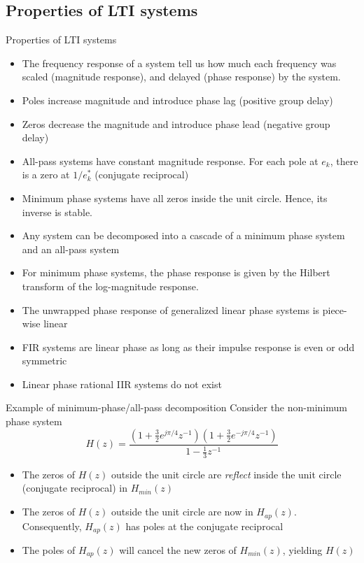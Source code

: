 \documentclass[10pt, aspectratio=169]{beamer}
\begin{document}
%
\subsection{Properties of LTI systems}
\begin{frame}{Properties of LTI systems}
\begin{itemize}
	\item The frequency response of a system tell us how much each frequency was scaled (magnitude response), and delayed (phase response) by the system.
	\item Poles increase magnitude and introduce phase lag (positive group delay)
	\item Zeros decrease the magnitude and introduce phase lead (negative group delay)
	\item All-pass systems have constant magnitude response. For each pole at $e_k$, there is  a zero at $1/e^*_k$ (conjugate reciprocal)
	\item Minimum phase systems have all zeros inside the unit circle. Hence, its inverse is stable.
	\item Any system can be decomposed into a cascade of a minimum phase system and an all-pass system
	\item For minimum phase systems, the phase response is given by the Hilbert transform of the log-magnitude response. 
	\item The unwrapped phase response of generalized linear phase systems is piece-wise linear
	\item FIR systems are linear phase as long as their impulse response is even or odd symmetric
	\item Linear phase rational IIR systems do not exist
\end{itemize}
\end{frame}

\begin{frame}{Example of minimum-phase/all-pass decomposition}
Consider the non-minimum phase system
\begin{equation*}
H(z) = \frac{(1 + \frac{3}{2}e^{j\pi/4}z^{-1})(1 + \frac{3}{2}e^{-j\pi/4}z^{-1})}{1 - \frac{1}{3}z^{-1}}
\end{equation*}

\begin{center}
	\resizebox{0.75\paperwidth}{!}{}
\end{center}

\begin{itemize}
\item The zeros of $H(z)$ outside the unit circle are \textit{reflect} inside the unit circle (conjugate reciprocal) in $H_{min}(z)$
\item The zeros of $H(z)$ outside the unit circle are now in $H_{ap}(z)$. Consequently, $H_{ap}(z)$ has poles at the conjugate reciprocal
\item The poles of $H_{ap}(z)$ will cancel the new zeros of $H_{min}(z)$, yielding $H(z)$
\end{itemize}
\end{frame}
\end{document}
